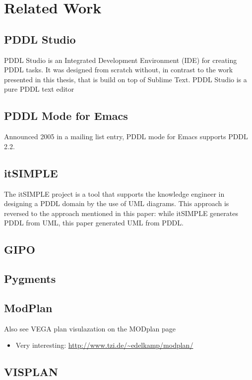 \documentclass[11pt]{report}
\begin{document}
\chapter{Related Work}
\label{sec-2}
\section{PDDL Studio}
\label{sec-2-1}
PDDL Studio \parencite{plch2012inspect} is an Integrated Development Environment (IDE) for
creating PDDL tasks. It was designed from scratch without, in contrast
to the work presented in this thesis, that is build on top of Sublime
Text. PDDL Studio is a pure PDDL text editor 

\section{PDDL Mode for Emacs}
\label{sec-2-2}
Announced 2005 in a mailing list entry, PDDL mode for Emacs supports
PDDL 2.2. 
\section{itSIMPLE}
\label{sec-2-3}
The itSIMPLE project is a tool that supports the knowledge engineer in
designing a PDDL domain by the use of UML diagrams. This approach is
reversed to the approach mentioned in this paper: while itSIMPLE
generates PDDL from UML, this paper generated UML from PDDL. 
\section{GIPO}
\label{sec-2-4}
\section{Pygments}
\label{sec-2-5}
\section{ModPlan}
\label{sec-2-6}
Also see VEGA plan visulazation on the MODplan page
\begin{itemize}
\item Very interesting: \url{http://www.tzi.de/~edelkamp/modplan/}
\end{itemize}

\section{VISPLAN}
\label{sec-2-7}
\end{document}

